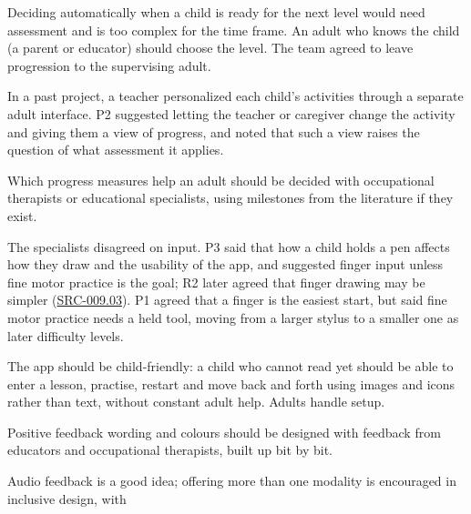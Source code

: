 \documentclass[12pt]{article}
\renewcommand{\_}{\textunderscore\allowbreak}%
\newcommand{\intlink}[3]{\hyperref[int:#1-#2]{#3}}
\newcommand{\intref}[2]{\intlink{#1}{#2}{#1, #2}}
\newcommand{\srcref}[1]{\hyperref[src:#1]{SRC-#1}}
\begin{document}
\begin{description}[leftmargin=1.5em, style=nextline]
\item[{\phantomsection%
  \label{src:005.01}SRC-005.01 (\intref{P1}{28:37}; \intref{P2}{29:18};
\intlink{Rayan}{30:20}{30:20--31:02})}] Deciding automatically when a child is
ready for the next level would need assessment and is too complex for the time
frame. An adult who knows the child (a parent or educator) should choose the
level. The team agreed to leave progression to the supervising adult.
\item[{\phantomsection%
  \label{src:005.02}SRC-005.02 (\intref{P2}{29:18})}] In a past project, a
teacher personalized each child's activities through a separate adult interface.
P2 suggested letting the teacher or caregiver change the activity and giving
them a view of progress, and noted that such a view raises the question of what
assessment it applies.
\item[{\phantomsection%
  \label{src:005.03}SRC-005.03 (\intref{P2}{31:42})}] Which progress measures
help an adult should be decided with occupational therapists or educational
specialists, using milestones from the literature if they exist.
\item[{\phantomsection%
  \label{src:005.04}SRC-005.04 (\intref{P3}{24:34}; \intref{P3}{25:36};
\intref{P1}{26:46})}] The specialists disagreed on input. P3 said that how a
child holds a pen affects how they draw and the usability of the app, and
suggested finger input unless fine motor practice is the goal; R2 later agreed
that finger drawing may be simpler (\srcref{009.03}). P1 agreed that a finger is
the easiest start, but said fine motor practice needs a held tool, moving from a
larger stylus to a smaller one as later difficulty levels.
\item[{\phantomsection%
  \label{src:005.05}SRC-005.05 (\intref{P1}{34:13})}] The app should be
child-friendly: a child who cannot read yet should be able to enter a lesson,
practise, restart and move back and forth using images and icons rather than
text, without constant adult help. Adults handle setup.
\item[{\phantomsection%
  \label{src:005.06}SRC-005.06 (\intref{P1}{36:26})}] Positive feedback wording
and colours should be designed with feedback from educators and occupational
therapists, built up bit by bit.
\item[{\phantomsection%
  \label{src:005.07}SRC-005.07 (\intref{P2}{37:39})}] Audio feedback is a good
idea; offering more than one modality is encouraged in inclusive design, with

\end{description}
\end{document}

